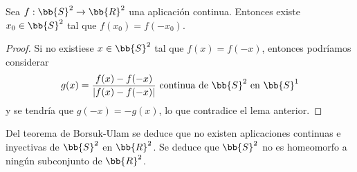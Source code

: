 \begin{teo}
    Sea $f:\bb{S}^2 \to \bb{R}^2$ una aplicación continua. Entonces existe $x_0\in \bb{S}^2$ tal que $f(x_0)=f(-x_0)$.

    \begin{proof}
        Si no existiese $x\in \bb{S}^2$ tal que $f(x)=f(-x)$, entonces podríamos considerar 
        \begin{gather*}
            g(x) = \frac{f(x)-f(-x)}{|f(x)-f(-x)|} \text{ continua de $\bb{S}^2$ en $\bb{S}^1$}
        \end{gather*}
        y se tendría que $g(-x)=-g(x)$, lo que contradice el lema anterior.
    \end{proof}
\end{teo}

\begin{observacion}
    Del teorema de Borsuk-Ulam se deduce que no existen aplicaciones continuas e inyectivas de $\bb{S}^2$ en $\bb{R}^2$. Se deduce que $\bb{S}^2$ no es homeomorfo a ningún subconjunto de $\bb{R}^2$.
\end{observacion}

